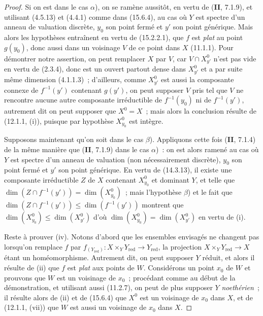 \begin{proof}
Si on est dans le cas $\alpha$), on se ramène aussitôt, en vertu de (\textbf{II}, 7.1.9), et utilisant (4.5.13) et (4.4.1) comme dans (15.6.4), au cas où $Y$ est spectre d'un anneau de valuation discrète, $y_0$ son point fermé et $y'$ son point générique. Mais alors les hypothèses entraînent en vertu de (15.2.2.1), que $f$ est \emph{plat} au point $g(y_0)$, donc aussi dans un voisinage $V$ de ce point dans $X$ (11.1.1). Pour démontrer notre assertion, on peut remplacer $X$ par $V$, car $V\cap X_{y'}^0$ n'est pas vide en vertu de (2.3.4), donc est un ouvert partout dense dans $X_{y'}^0$ et a par suite même dimension (4.1.1.3)~; d'ailleurs, comme $X_{y'}^0$ est aussi la composante connexe de $f^{-1}(y')$ contenant $g(y')$, on peut supposer $V$ pris tel que $V$ ne rencontre aucune autre composante irréductible de $f^{-1}(y_0)$ ni de $f^{-1}(y')$, autrement dit on peut supposer que $X^0=X$~; mais alors la conclusion résulte de (12.1.1, (i)), puisque par hypothèse $X_{y_0}^0$ est intègre.

Supposons maintenant qu'on soit dans le cas $\beta$). Appliquons cette fois (\textbf{II}, 7.1.4) de la même manière que (\textbf{II}, 7.1.9) dans le cas $\alpha$)~: on est alors ramené au cas où $Y$ est spectre d'un anneau de valuation (non nécessairement discrète), $y_0$ son point fermé et $y'$ son point générique. En vertu de (14.3.13), il existe une composante irréductible $Z$ de $X$ contenant $X_{y_0}^0$ et dominant $Y$, et telle que $\dim(Z\cap f^{-1}(y'))=\dim(X_{y_0}^0)$~; mais l'hypothèse $\beta$) et le fait que $\dim(Z\cap f^{-1}(y'))\leqslant\dim(f^{-1}(y'))$ montrent que $\dim(X_{y_0}^0)\leqslant\dim(X_{y'}^0)$ d'où $\dim(X_{y_0}^0)=\dim(X_{y'}^0)$ en vertu de (i).

Reste à prouver (iv). Notons d'abord que les ensembles envisagés ne changent pas lorsqu'on remplace $f$ par $f_{(Y_{\mathrm{red}})}:X\times_Y Y_{\mathrm{red}}\to Y_{\mathrm{red}}$, la projection $X\times_Y Y_{\mathrm{red}}\to X$ étant un homéomorphisme. Autrement dit, on peut supposer $Y$ réduit, et alors il résulte de (ii) que $f$ est \emph{plat} aux points de $W$. Considérons un point $x_0$ de $W$ et prouvons que $W$ est un voisinage de $x_0$~; procédant comme au début de la démonstration, et utilisant aussi (11.2.7), on peut de plus supposer $Y$ \emph{noethérien}~; il résulte alors de (ii) et de (15.6.4) que $X^0$ est un voisinage de $x_0$ dans $X$, et de (12.1.1, (vii)) que $W$ est aussi un voisinage de $x_0$ dans $X$.
\end{proof}

